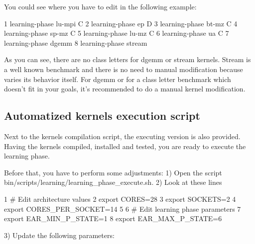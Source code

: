 You could see where you have to edit in the following example\+: 
\begin{DoxyCode}
1 learning-phase lu-mpi C
2 learning-phase ep D
3 learning-phase bt-mz C
4 learning-phase sp-mz C
5 learning-phase lu-mz C
6 learning-phase ua C
7 learning-phase dgemm
8 learning-phase stream
\end{DoxyCode}


As you can see, there are no class letters for {\ttfamily dgemm} or {\ttfamily stream} kernels. Stream is a well known benchmark and there is no need to manual modification because varies its behavior itself. For {\ttfamily dgemm} or for a class letter benchmark which doesn’t fit in your goals, it’s recommended to do a manual kernel modification.

\subsection*{Automatized kernels execution script }

Next to the kernels compilation script, the executing version is also provided. Having the kernels compiled, installed and tested, you are ready to execute the learning phase.

Before that, you have to perform some adjustments\+: 1) Open the script {\ttfamily bin/scripts/learning/learning\+\_\+phase\+\_\+execute.\+sh}. 2) Look at these lines 
\begin{DoxyCode}
1 # Edit architecture values
2 export CORES=28
3 export SOCKETS=2
4 export CORES\_PER\_SOCKET=14
5 
6 # Edit learning phase parameters
7 export EAR\_MIN\_P\_STATE=1
8 export EAR\_MAX\_P\_STATE=6
\end{DoxyCode}
 3) Update the following parameters\+:~\newline

